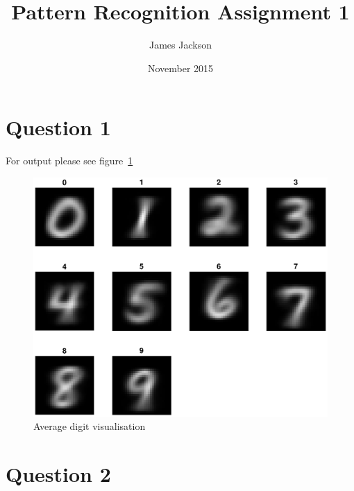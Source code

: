 \documentclass{article}
\title{Pattern Recognition Assignment 1}
\author{James Jackson}
\date{November 2015}
\begin{document}
\maketitle

\section*{Question 1}

For output please see figure~\ref{fig:digits}
\begin{figure}
\centering
\includegraphics[width=\textwidth]{digits}
\caption{Average digit visualisation}
\label{fig:digits}
\end{figure}

\pagebreak

\section*{Question 2}

\pagebreak
\end{document}
